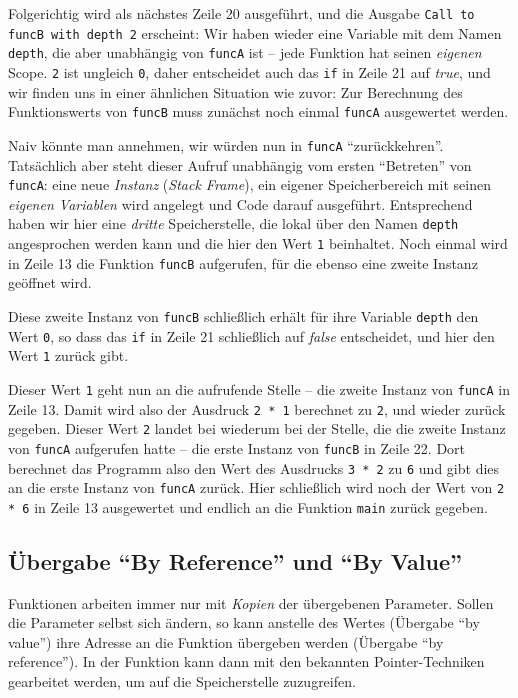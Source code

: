Folgerichtig wird als nächstes Zeile 20 ausgeführt, und die Ausgabe \texttt{Call to funcB with depth 2} erscheint: Wir haben wieder eine Variable mit dem Namen \texttt{depth}, die aber unabhängig von \texttt{funcA} ist -- jede Funktion hat seinen \emph{eigenen} Scope. \texttt{2} ist ungleich \texttt{0}, daher entscheidet auch das \texttt{if} in Zeile 21 auf \emph{true}, und wir finden uns in einer ähnlichen Situation wie zuvor: Zur Berechnung des Funktionswerts von \texttt{funcB} muss zunächst noch einmal \texttt{funcA} ausgewertet werden.

Naiv könnte man annehmen, wir würden nun in \texttt{funcA} \enquote{zurückkehren}. Tatsächlich aber steht dieser Aufruf unabhängig vom ersten \enquote{Betreten} von \texttt{funcA}: eine neue \emph{Instanz} (\emph{Stack Frame}), \ie ein eigener Speicherbereich mit seinen \emph{eigenen Variablen} wird angelegt und Code darauf ausgeführt. Entsprechend haben wir hier eine \emph{dritte} Speicherstelle, die lokal über den Namen \texttt{depth} angesprochen werden kann und die hier den Wert \texttt{1} beinhaltet. Noch einmal wird in Zeile 13 die Funktion \texttt{funcB} aufgerufen, für die ebenso eine zweite Instanz geöffnet wird.

Diese zweite Instanz von \texttt{funcB} schließlich erhält für ihre Variable \texttt{depth} den Wert \texttt{0}, so dass das \texttt{if} in Zeile 21 schließlich auf \emph{false} entscheidet, und hier den Wert \texttt{1} zurück gibt.

Dieser Wert \texttt{1} geht nun an die aufrufende Stelle -- \ie die zweite Instanz von \texttt{funcA} in Zeile 13. Damit wird also der Ausdruck \texttt{2 * 1} berechnet zu \texttt{2}, und wieder zurück gegeben. Dieser Wert \texttt{2} landet bei wiederum bei der Stelle, die die zweite Instanz von \texttt{funcA} aufgerufen hatte -- die erste Instanz von \texttt{funcB} in Zeile 22. Dort berechnet das Programm also den Wert des Ausdrucks \texttt{3 * 2} zu \texttt{6} und gibt dies an die erste Instanz von \texttt{funcA} zurück. Hier schließlich wird noch der Wert von \texttt{2 * 6} in Zeile 13 ausgewertet und endlich an die Funktion \texttt{main} zurück gegeben.

\subsection{Übergabe \enquote{By Reference} und \enquote{By Value}}
Funktionen arbeiten immer nur mit \emph{Kopien} der übergebenen Parameter. Sollen die Parameter selbst sich ändern, so kann anstelle des Wertes (Übergabe \enquote{by value}) ihre Adresse an die Funktion übergeben werden (Übergabe \enquote{by reference}). In der Funktion kann dann mit den bekannten Pointer-Techniken gearbeitet werden, um auf die Speicherstelle zuzugreifen.

